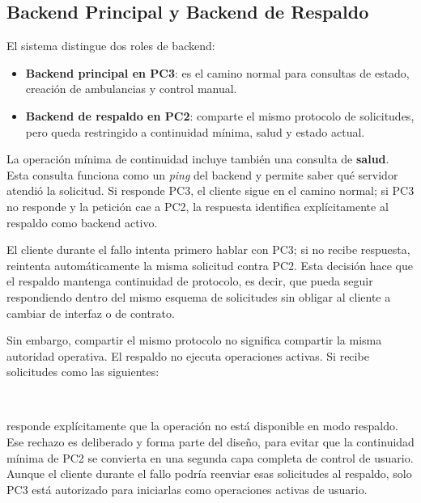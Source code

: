 \documentclass[12pt, a4paper]{article}
\let\oldtexttt\texttt
\renewcommand{\texttt}[1]{\oldtexttt{\seqsplit{#1}}}
\begin{document}
\subsection{Backend Principal y Backend de Respaldo}

El sistema distingue dos roles de backend:

\begin{itemize}
    \item \textbf{Backend principal en PC3}: es el camino normal para consultas de estado, creación de ambulancias y control manual.
    \item \textbf{Backend de respaldo en PC2}: comparte el mismo protocolo de solicitudes, pero queda restringido a continuidad mínima, salud y estado actual.
\end{itemize}

La operación mínima de continuidad incluye también una consulta de \textbf{salud}. Esta consulta funciona como un \textit{ping} del backend y permite saber qué servidor atendió la solicitud. Si responde PC3, el cliente sigue en el camino normal; si PC3 no responde y la petición cae a PC2, la respuesta identifica explícitamente al respaldo como backend activo.

El cliente durante el fallo intenta primero hablar con PC3; si no recibe respuesta, reintenta automáticamente la misma solicitud contra PC2. Esta decisión hace que el respaldo mantenga continuidad de protocolo, es decir, que pueda seguir respondiendo dentro del mismo esquema de solicitudes sin obligar al cliente a cambiar de interfaz o de contrato.

Sin embargo, compartir el mismo protocolo no significa compartir la misma autoridad operativa. El respaldo no ejecuta operaciones activas. Si recibe solicitudes como las siguientes:

\noindent\texttt{crear\_ambulancia}\\
\texttt{control\_manual}

\noindent responde explícitamente que la operación no está disponible en modo respaldo. Ese rechazo es deliberado y forma parte del diseño, para evitar que la continuidad mínima de PC2 se convierta en una segunda capa completa de control de usuario. Aunque el cliente durante el fallo podría reenviar esas solicitudes al respaldo, solo PC3 está autorizado para iniciarlas como operaciones activas de usuario.

\end{document}
